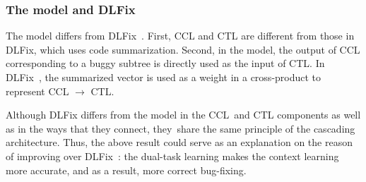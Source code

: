 

\subsubsection{{\bf The  model and DLFix~\cite{icse20}}}

The  model differs from DLFix~\cite{icse20}. First,
CCL and CTL are different from those in
DLFix, which uses code summarization. Second, in the 
model, the output of CCL corresponding to a buggy subtree is directly
used as the input of CTL. In DLFix~\cite{icse20}, the summarized
vector is used as a weight in a cross-product to represent 
CCL $\rightarrow$ CTL.

Although DLFix differs from the  model in the CCL~and
CTL components as well as in the ways that they connect, they~share
the same principle of the cascading architecture. Thus, the above result
could serve as an explanation on the reason of {\tool} improving over
DLFix~\cite{icse20}: the dual-task learning makes the context learning
more accurate, and as a result, more correct bug-fixing.






